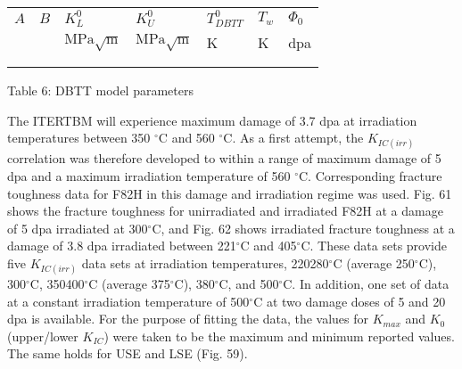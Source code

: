 \documentclass[letterpaper,10pt,english]{jupyterBook}
\begin{document}
	
	\begin{savenotes}\sphinxattablestart
		\sphinxthistablewithglobalstyle
		\centering
		\begin{tabulary}{\linewidth}[t]{TTTTTTT}
			\sphinxtoprule
			\sphinxstyletheadfamily 
			\sphinxAtStartPar
			\(A\)
			&\sphinxstyletheadfamily 
			\sphinxAtStartPar
			\(B\)
			&\sphinxstyletheadfamily 
			\sphinxAtStartPar
			\(K_L^0\)
			&\sphinxstyletheadfamily 
			\sphinxAtStartPar
			\(K_U^0\)
			&\sphinxstyletheadfamily 
			\sphinxAtStartPar
			\(T_{DBTT}^0\)
			&\sphinxstyletheadfamily 
			\sphinxAtStartPar
			\(T_w\)
			&\sphinxstyletheadfamily 
			\sphinxAtStartPar
			\(\Phi_0\)
			\\
			\sphinxmidrule
			\sphinxtableatstartofbodyhook
			\sphinxAtStartPar
			\sphinxhyphen{}
			&
			\sphinxAtStartPar
			\sphinxhyphen{}
			&
			\sphinxAtStartPar
			\(\text{MPa}\sqrt{\text{m}}\)
			&
			\sphinxAtStartPar
			\(\text{MPa}\sqrt{\text{m}}\)
			&
			\sphinxAtStartPar
			K
			&
			\sphinxAtStartPar
			K
			&
			\sphinxAtStartPar
			dpa
			\\
			\sphinxhline
			&
			&
			&
			&
			&
			&
			\\
			\sphinxbottomrule
		\end{tabulary}
		\sphinxtableafterendhook\par
		\sphinxattableend\end{savenotes}
	
	\sphinxAtStartPar
	Table 6: DBTT model parameters
	
	\sphinxAtStartPar
	The ITER\sphinxhyphen{}TBM will experience maximum damage of 3.7 dpa at irradiation temperatures between 350 \(^\circ\)C and 560 \(^\circ\)C. As a first attempt, the \(K_{IC(irr)}\)  correlation was therefore developed to within a range of maximum damage of 5 dpa and a maximum irradiation temperature of 560 \(^\circ\)C. Corresponding fracture toughness data for F82H in this damage and irradiation regime was used. Fig. 61 shows the fracture toughness for un\sphinxhyphen{}irradiated and irradiated F82H at a damage of 5 dpa irradiated at 300\(^\circ\)C, and Fig. 62 shows irradiated fracture toughness at a damage of 3.8 dpa irradiated between 221\(^\circ\)C and 405\(^\circ\)C. These data sets provide five  \(K_{IC(irr)}\)  data sets at irradiation temperatures, 220\sphinxhyphen{}280\(^\circ\)C (average 250\(^\circ\)C), 300\(^\circ\)C, 350\sphinxhyphen{}400\(^\circ\)C (average 375\(^\circ\)C), 380\(^\circ\)C, and 500\(^\circ\)C. In addition, one set of data at a constant irradiation temperature of 500\(^\circ\)C at two damage doses of 5 and 20 dpa is available.  For the purpose of fitting the data, the values for \(K_{max}\) and \(K_0\) (upper/lower \(K_{IC}\)) were taken to be the maximum and minimum reported values. The same holds for USE and LSE (Fig. 59).
	
\end{document}
